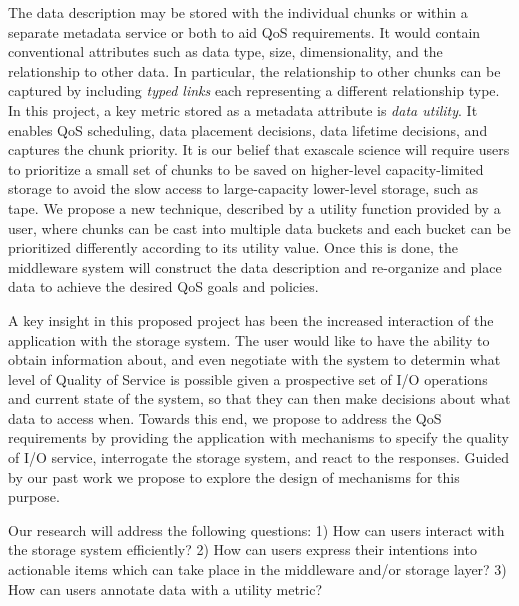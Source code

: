 The data description may be stored with the individual chunks or within a
separate metadata service or both to aid QoS requirements. It would contain
conventional attributes such as data type, size, dimensionality, and the
relationship to other data. In particular, the relationship to other chunks can
be captured by including \textit{typed links} each representing a different
relationship type.  In this project, a key metric stored as a metadata
attribute is \textit{data utility}.  It enables QoS scheduling, data placement
decisions, data lifetime decisions, and captures the chunk priority. It is
our belief that exascale science will require users to prioritize a small set
of chunks to be saved on higher-level capacity-limited storage to avoid the
slow access to large-capacity lower-level storage, such as tape.  We propose a
new technique, described by a utility function provided by a user, where chunks
can be cast into multiple data buckets and each bucket can be prioritized
differently according to its utility value.  Once this is done, the middleware
system will construct the data description and re-organize and place data to
achieve the desired QoS goals and policies.

A key insight in this proposed project has been the increased interaction of
the application with the storage system.
The user would like to have the ability to obtain information about, and even
negotiate with the system to determin what
level of Quality of Service is possible given
a prospective set of I/O operations and current state of the system, so that
they can then make decisions about what data to access when.
Towards this end, we propose to
address the QoS requirements by providing the application with mechanisms to
specify the quality of I/O service, interrogate the storage system, and react
to the responses. Guided by our past work we propose to explore the design of
mechanisms for this purpose. 

Our research will address the following questions:
1) How can users interact with the storage system efficiently?
2) How can users express their intentions into actionable items which can take place in the middleware and/or storage layer?
3) How can users annotate data with a utility metric?

